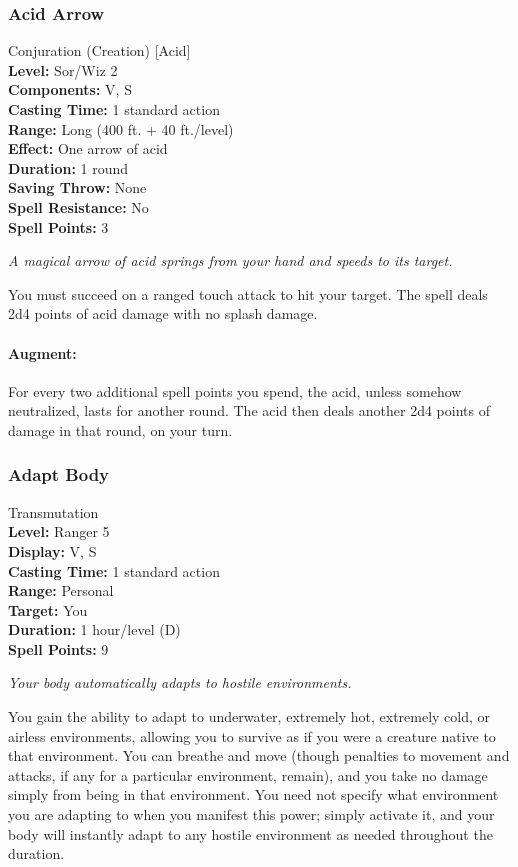 \subsubsection{Acid Arrow}
\label{Spell:AcidArrow}
Conjuration (Creation) [Acid]
\\ \textbf{Level:} Sor/Wiz 2
\\ \textbf{Components:} V, S
\\ \textbf{Casting Time:} 1 standard action
\\ \textbf{Range:} Long (400 ft. + 40 ft./level)
\\ \textbf{Effect:} One arrow of acid
\\ \textbf{Duration:} 1 round
\\ \textbf{Saving Throw:} None
\\ \textbf{Spell Resistance:} No
\\ \textbf{Spell Points:} 3

\emph{A magical arrow of acid springs from your hand and speeds to its target.}

You must succeed on a ranged touch attack to hit your target.
The spell deals 2d4 points of acid damage with no splash damage.

\paragraph{Augment:}
For every two additional spell points you spend, the acid, unless somehow neutralized, lasts for another round. 
The acid then deals another 2d4 points of damage in that round, on your turn.
\subsubsection{Adapt Body}
\label{Spell:AdaptBody}
Transmutation
\\ \textbf{Level:} Ranger 5
\\ \textbf{Display:} V, S
\\ \textbf{Casting Time:} 1 standard action
\\ \textbf{Range:} Personal
\\ \textbf{Target:} You
\\ \textbf{Duration:} 1 hour/level (D)
\\ \textbf{Spell Points:} 9

\emph{Your body automatically adapts to hostile environments.} 

You gain the ability to adapt to underwater, extremely hot, extremely cold, or airless environments, allowing you to survive as if you were a creature native to that environment. 
You can breathe and move (though penalties to movement and attacks, if any for a particular environment, remain), and you take no damage simply from being in that environment.
You need not specify what environment you are adapting to when you manifest this power; simply activate it, and your body will instantly adapt to any hostile environment as needed throughout the duration.

